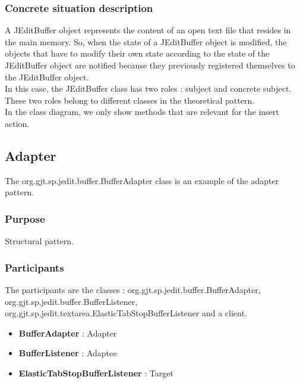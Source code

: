 \documentclass[a4paper,10pt]{article}
\begin{document}
\subsubsection{Concrete situation description}
A JEditBuffer object represents the content of an open text file that resides in the main memory. So, when the state of a JEditBuffer object is modified, the objects that have to modify their own state according to the state of the JEditBuffer object are notified because they previously registered themselves to the JEditBuffer object.\\
In this case, the JEditBuffer class has two roles : subject and concrete subject. These two roles belong to different classes in the theoretical pattern.\\
In the class diagram, we only show methods that are relevant for the insert action. 

\newpage
\subsection{Adapter}
The org.gjt.sp.jedit.buffer.BufferAdapter class is an example of the adapter pattern.

\subsubsection{Purpose}
Structural pattern.
\subsubsection[Participants]{Participants\footnotemark[1]}
The participants are the classes : org.gjt.sp.jedit.buffer.BufferAdapter, org.gjt.sp.jedit.buffer.BufferListener, org.gjt.sp.jedit.textarea.ElasticTabStopBufferListener and a client.
\begin{itemize}
 \item \textbf{BufferAdapter} : Adapter
 \item \textbf{BufferListener} : Adaptee
 \item \textbf{ElasticTabStopBufferListener} : Target
\end{itemize}
\end{document}
